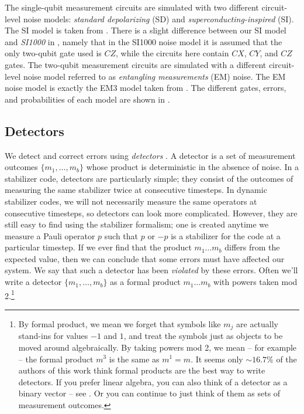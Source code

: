 The single-qubit measurement circuits are simulated with two different circuit-level noise models: \textit{standard depolarizing} (SD) and \textit{superconducting-inspired} (SI).
The SI model is taken from .
There is a slight difference between our SI model and \textit{SI1000} in , namely that in the SI1000 noise model it is assumed that the only two-qubit gate used is $CZ$, while the circuits here contain $CX$, $CY$, and $CZ$ gates.
The two-qubit measurement circuits are simulated with a different circuit-level noise model referred to as \textit{entangling measurements} (EM) noise.
The EM noise model is exactly the EM3 model taken from .
The different gates, errors, and probabilities of each model are shown in .

\subsection{Detectors}\label{subsec:detectors}

We detect and correct errors using \textit{detectors}
\cite{Gidney2021stimfaststabilizer,derks2024}.
A detector is a set of measurement outcomes $\{m_1, \ldots, m_b\}$ whose product is deterministic in the absence of noise.
In a stabilizer code, detectors are particularly simple;
they consist of the outcomes of measuring the same stabilizer twice at consecutive timesteps. In dynamic stabilizer codes, we will not necessarily measure the same operators at consecutive timesteps,
so detectors can look more complicated.
However, they are still easy to find using the stabilizer formalism;
one is created anytime we measure a Pauli operator $p$ such that
$p$ or $-p$ is a stabilizer for the code at a particular timestep.
If we ever find that the product $m_1 \ldots m_b$ differs from the expected value,
then we can conclude that some errors must have affected our system.
We say that such a detector has been \textit{violated} by these errors.
Often we'll write a detector $\{m_1, \ldots, m_b\}$ as a formal product $m_1 \ldots m_b$ with powers taken mod 2.\footnote{%
    By formal product, we mean we forget that symbols like $m_j$ are actually stand-ins for values $-1$ and $1$,
    and treat the symbols just as objects to be moved around algebraically.
    By taking powers mod 2, we mean -- for example -- the formal product $m^3$ is the same as $m^1 =  m$.
    It seems only ${\sim}16.7\%$ of the authors of this work think formal products are the best way to write detectors.
    If you prefer linear algebra,
    you can also think of a detector as a binary vector -- see .
    Or you can continue to just think of them as sets of measurement outcomes.}


